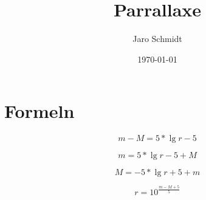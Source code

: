 \documentclass{article}
\title{Parrallaxe}
\author{Jaro Schmidt}
\date{\today}
\begin{document}
	\maketitle
	
	\section{Formeln}
	
	\[m-M = 5*\lg{r} - 5\]

	\[m = 5*\lg{r} -5 + M\]

	\[M = -5*\lg{r} + 5 + m\]

	\[r = 10^{\frac{m-M+5}{5}}\]
\end{document}
